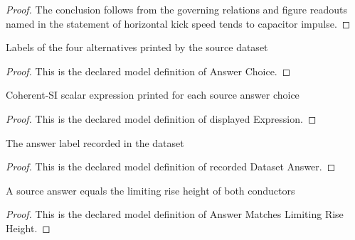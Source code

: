 \begin{proof}
  The conclusion follows from the governing relations and figure readouts named in the statement of horizontal kick speed tends to capacitor impulse.
\end{proof}
\begin{definition}
  \label{def:physics:phyx-mini-0971:phyxminiproblems-problemphyxmini0971-answerchoice}
  Labels of the four alternatives printed by the source dataset
\end{definition}
\begin{proof}
  This is the declared model definition of Answer Choice.
\end{proof}
\begin{definition}
  \label{def:physics:phyx-mini-0971:phyxminiproblems-problemphyxmini0971-answerchoice-displayedexpression}
  Coherent-SI scalar expression printed for each source answer choice
\end{definition}
\begin{proof}
  This is the declared model definition of displayed Expression.
\end{proof}
\begin{definition}
  \label{def:physics:phyx-mini-0971:phyxminiproblems-problemphyxmini0971-recordeddatasetanswer}
  The answer label recorded in the dataset
\end{definition}
\begin{proof}
  This is the declared model definition of recorded Dataset Answer.
\end{proof}
\begin{definition}
  \label{def:physics:phyx-mini-0971:phyxminiproblems-problemphyxmini0971-answermatcheslimitingriseheight}
  A source answer equals the limiting rise height of both conductors
\end{definition}
\begin{proof}
  This is the declared model definition of Answer Matches Limiting Rise Height.
\end{proof}
